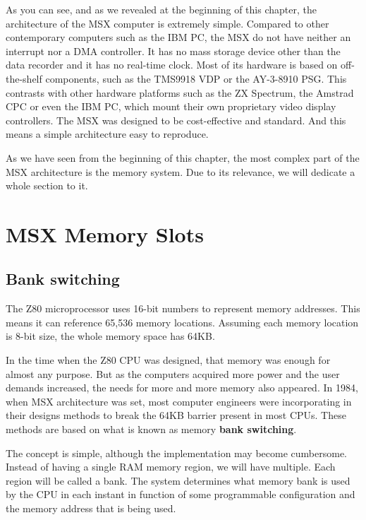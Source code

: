 As you can see, and as we revealed at the beginning of this chapter, the architecture of the MSX computer is extremely simple. Compared to other contemporary computers such as the IBM PC, the MSX do not have neither an interrupt nor a DMA controller. It has no mass storage device other than the data recorder and it has no real-time clock. Most of its hardware is based on off-the-shelf components, such as the TMS9918 VDP or the AY-3-8910 PSG. This contrasts with other hardware platforms such as the ZX Spectrum, the Amstrad CPC or even the IBM PC, which mount their own proprietary video display controllers. The MSX was designed to be cost-effective and standard. And this means a simple architecture easy to reproduce. 

As we have seen from the beginning of this chapter, the most complex part of the MSX architecture is the memory system. Due to its relevance, we will dedicate a whole section to it.

\section{MSX Memory Slots}
\label{sec:msx-mem-slots}

\subsection{Bank switching}

The Z80 microprocessor uses 16-bit numbers to represent memory addresses. This means it can reference 65,536 memory locations. Assuming each memory location is 8-bit size, the whole memory space has 64KB. 

In the time when the Z80 CPU was designed, that memory was enough for almost any purpose. But as the computers acquired more power and the user demands increased, the needs for more and more memory also appeared. In 1984, when MSX architecture was set, most computer engineers were incorporating in their designs methods to break the 64KB barrier present in most CPUs. These methods are based on what is known as memory {\bf bank switching}. 

The concept is simple, although the implementation may become cumbersome. Instead of having a single RAM memory region, we will have multiple. Each region will be called a bank. The system determines what memory bank is used by the CPU in each instant in function of some programmable configuration and the memory address that is being used. 

